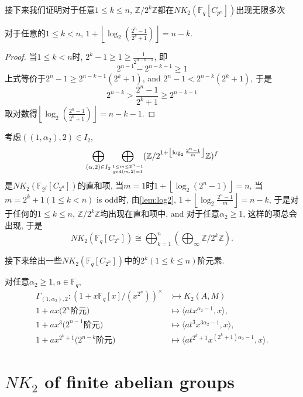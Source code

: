接下来我们证明对于任意$1\leq k\leq n$, $\mathbb{Z}/2^k \mathbb{Z}$都在$NK_2(\mathbb{F}_q[C_{p^n}])$出现无限多次
\begin{lemma}
\label{lem:log2}
	对于任意的$1\leq k < n$, $1+\left \lfloor \log_2(\frac{2^n-1}{2^k+1}) \right \rfloor = n-k$. 
\end{lemma}
\begin{proof}
	当$1\leq k < n$时, $2^k-1\geq 1 \geq \frac{1}{2^{n-k-1}}$, 即
	\[2^{n-1}-2^{n-k-1}\geq 1 \]
	上式等价于$2^n-1\geq 2^{n-k-1}(2^k+1)$, and $2^n-1<2^{n-k}(2^k+1)$, 于是
	\[2^{n-k}> \frac{2^n-1}{2^k+1} \geq 2^{n-k-1}\]
	取对数得$\left \lfloor \log_2(\frac{2^n-1}{2^k+1}) \right \rfloor = n-k-1$. 
\end{proof}
考虑$((1,\alpha_2),2)\in I_2$, 
$$\bigoplus_{(\alpha,2)\in I_2}\bigoplus_{\scriptsize\substack{1\leq m\leq  2^n-1 \\ gcd(m,2)=1 }}(\mathbb{Z}/2^{1+ \left \lfloor\log_2 \frac{2^n-1}{m}  \right \rfloor}\mathbb{Z})^f$$
是$NK_2(\mathbb{F}_{2^f}[C_{2^n}])$的直和项, 当$m=1$时$1+ \left \lfloor\log_2 (2^n-1)\right \rfloor=n$, 当$m=2^k+1 (1\leq k < n)$ is odd时, 由\ref{lem:log2}, $1+ \left \lfloor\log_2 \frac{2^n-1}{m}\right \rfloor=n-k$, 于是对于任何的$1\leq k\leq n$, $\mathbb{Z}/2^k\mathbb{Z}$均出现在直和项中, and 对于任意$\alpha_2\geq 1$, 这样的项总会出现, 于是
\[NK_2(\mathbb{F}_q[C_{2^n}])\cong  \bigoplus_{k=1}^n (\bigoplus_\infty \mathbb{Z}/2^k\mathbb{Z}).\]

接下来给出一些$NK_2(\mathbb{F}_q[C_{2^n}])$中的$2^k(1\leq k \leq n)$阶元素. 

对任意$\alpha_2\geq 1, a\in \mathbb{F}_q$, 
  \begin{align*}
 \Gamma_{(1,\alpha_2),2} \colon (1+x \mathbb{F}_q[x]/(x^{2^n}))^{\times} &\rightarrowtail K_2(A,M)\\
 1+ax \text{($2^n$阶元)} &\mapsto \langle atx^{\alpha_2-1},x \rangle,\\
 1+ax^3 \text{($2^{n-1}$阶元)} &\mapsto \langle at^3x^{3\alpha_2-1},x \rangle,\\
 1+ax^{2^k+1} \text{($2^{n-k}$阶元)} &\mapsto \langle at^{2^k+1}x^{(2^k+1)\alpha_2-1},x \rangle.
 \end{align*}






% 

\section{$NK_2$ of finite abelian groups}

